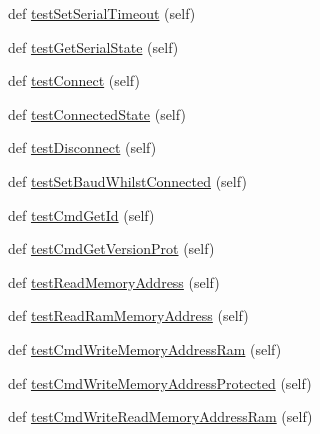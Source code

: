 \begin{DoxyCompactItemize}
\item 
def \hyperlink{classstm__tools_1_1tests_1_1serialflasher__test_1_1SerialFlasherTestCase_ae3c687b584b4a279bd9df22cb2fef811}{test\+Set\+Serial\+Timeout} (self)
\item 
def \hyperlink{classstm__tools_1_1tests_1_1serialflasher__test_1_1SerialFlasherTestCase_a863c0a82485e80b7005e738b2bacefb8}{test\+Get\+Serial\+State} (self)
\item 
def \hyperlink{classstm__tools_1_1tests_1_1serialflasher__test_1_1SerialFlasherTestCase_a114db03b48126022cfcd2d0dc4fb26b3}{test\+Connect} (self)
\item 
def \hyperlink{classstm__tools_1_1tests_1_1serialflasher__test_1_1SerialFlasherTestCase_ac1cbca85ce618094d632a0af16ba52e6}{test\+Connected\+State} (self)
\item 
def \hyperlink{classstm__tools_1_1tests_1_1serialflasher__test_1_1SerialFlasherTestCase_ac9751871872b8bfb27e061c108222282}{test\+Disconnect} (self)
\item 
def \hyperlink{classstm__tools_1_1tests_1_1serialflasher__test_1_1SerialFlasherTestCase_af486717823faa844b9bc5d9cb03f7b61}{test\+Set\+Baud\+Whilst\+Connected} (self)
\item 
def \hyperlink{classstm__tools_1_1tests_1_1serialflasher__test_1_1SerialFlasherTestCase_a103102126afd6a4b959d0c10473cc787}{test\+Cmd\+Get\+Id} (self)
\item 
def \hyperlink{classstm__tools_1_1tests_1_1serialflasher__test_1_1SerialFlasherTestCase_a8c6d66f97f8060adc810eb666ef4cca7}{test\+Cmd\+Get\+Version\+Prot} (self)
\item 
def \hyperlink{classstm__tools_1_1tests_1_1serialflasher__test_1_1SerialFlasherTestCase_abcb99be50edb3c671a3b2a8246921600}{test\+Read\+Memory\+Address} (self)
\item 
def \hyperlink{classstm__tools_1_1tests_1_1serialflasher__test_1_1SerialFlasherTestCase_a5b970a4209778cf5951059570a5fad06}{test\+Read\+Ram\+Memory\+Address} (self)
\item 
def \hyperlink{classstm__tools_1_1tests_1_1serialflasher__test_1_1SerialFlasherTestCase_a000717609bc7fcbdcd0466f55c6593d6}{test\+Cmd\+Write\+Memory\+Address\+Ram} (self)
\item 
def \hyperlink{classstm__tools_1_1tests_1_1serialflasher__test_1_1SerialFlasherTestCase_af6c1e00106ebeaf5cdaf948b299f988a}{test\+Cmd\+Write\+Memory\+Address\+Protected} (self)
\item 
def \hyperlink{classstm__tools_1_1tests_1_1serialflasher__test_1_1SerialFlasherTestCase_a61f04287c66a27d3a90210980b991b55}{test\+Cmd\+Write\+Read\+Memory\+Address\+Ram} (self)

\end{DoxyCompactItemize}
